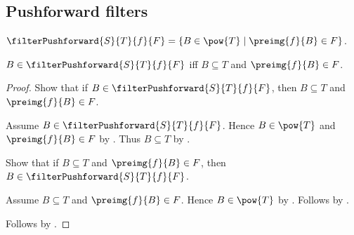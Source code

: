\subsection{Pushforward filters}

\begin{definition}\label{filter_pushforward}
    $\filterPushforward{S}{T}{f}{F}
        =\{B\in\pow{T}\mid\preimg{f}{B}\in F\}$.
\end{definition}

\begin{proposition}\label{filter_pushforward_iff}
    $B\in\filterPushforward{S}{T}{f}{F}$ iff
        $B\subseteq T$ and $\preimg{f}{B}\in F$.
\end{proposition}
\begin{proof}
    Show that if $B\in\filterPushforward{S}{T}{f}{F}$, then
        $B\subseteq T$ and $\preimg{f}{B}\in F$.
    \begin{subproof}
        Assume $B\in\filterPushforward{S}{T}{f}{F}$.
        Hence $B\in\pow{T}$ and $\preimg{f}{B}\in F$ by
            .
        Thus $B\subseteq T$ by .
    \end{subproof}
    Show that if $B\subseteq T$ and $\preimg{f}{B}\in F$, then
        $B\in\filterPushforward{S}{T}{f}{F}$.
    \begin{subproof}
        Assume $B\subseteq T$ and $\preimg{f}{B}\in F$.
        Hence $B\in\pow{T}$ by .
        Follows by .
    \end{subproof}
    Follows by \auto.
\end{proof}

